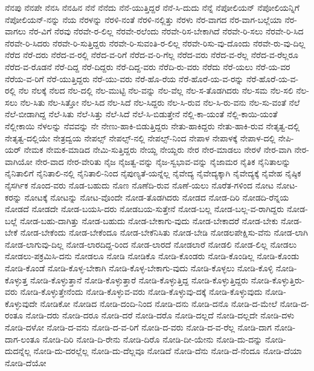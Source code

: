 {ನೆನಪು
ನೆನಪೇ
ನೆನಸಿ
ನೆನಹಿನ
ನೆನೆ
ನೆನೆದು
ನೆನೆ-ಯುತ್ತಿದ್ದರೆ
ನೆನೆ-ಸಿ-ದುದು
ನೆನ್ನೆ
ನೆಪೋಲಿಯನ್
ನೆಪೋಲಿಯನ್ನಿಗೆ
ನೆಪೋಲಿಯನ್-ನನ್ನು
ನೆಯ
ನೆರಳನ್ನು
ನೆರಳಿ-ನಂತೆ
ನೆರಳಿ-ನಲ್ಲಿತ್ತು
ನೆರಳು
ನೆರ-ವಾಗದ
ನೆರ-ವಾಗ-ಬಲ್ಲೆಯಾ
ನೆರ-ವಾಗಲು
ನೆರ-ವಿಗೆ
ನೆರವು
ನೆರವೇ-ರ-ಲಿಲ್ಲ
ನೆರವೇ-ರಲೆಂದು
ನೆರವೇ-ರಿಸ-ಬೇಕಾಗಿದೆ
ನೆರವೇ-ರಿ-ಸಲು
ನೆರವೇ-ರಿ-ಸಿದ
ನೆರವೇ-ರಿ-ಸಿದರು
ನೆರವೇ-ರಿ-ಸುತ್ತಿದ್ದರು
ನೆರವೇ-ರಿ-ಸುವಂತಿ-ರ-ಲಿಲ್ಲ
ನೆರವೇ-ರಿಸು-ವು-ದೊಂದು
ನೆರವೇ-ರು-ವು-ದಿಲ್ಲ
ನೆರೆದ
ನೆರೆ-ದರು
ನೆರೆದ-ವ-ರಲ್ಲಿ
ನೆರೆದ-ವ-ರಿಗೆ
ನೆರೆದ-ವ-ರಿ-ಗೆಲ್ಲ
ನೆರೆದ-ವರು
ನೆರೆದ-ವ-ರೆಲ್ಲ
ನೆರೆದ-ವ-ರೆಲ್ಲರೂ
ನೆರೆದ-ವ-ರೊಡನೆ
ನೆರೆ-ದಿದ್ದ
ನೆರೆ-ದಿದ್ದರು
ನೆರೆ-ದಿದ್ದ-ವರು
ನೆರೆದಿ-ರು-ವರು
ನೆರೆದು
ನೆರೆ-ಯಲು
ನೆರೆ-ಯ-ವರ
ನೆರೆಯ-ವ-ರಿಗೆ
ನೆರೆ-ಯುತ್ತಿದ್ದರು
ನೆರೆ-ಯು-ವರು
ನೆರೆ-ಹೊ-ರೆಯ
ನೆರೆ-ಹೊರೆ-ಯ-ವ-ರನ್ನು
ನೆರೆ-ಹೊರೆ-ಯ-ವ-ರಲ್ಲಿ
ನೆಲ
ನೆಲಕ್ಕೆ
ನೆಲದ
ನೆಲ-ದಲ್ಲಿ
ನೆಲ-ಮುಟ್ಟಿ
ನೆಲ-ವನ್ನು
ನೆಲ-ವೆಲ್ಲ
ನೆಲ-ಸ-ತೊಡಗಿದರು
ನೆಲ-ಸಮ
ನೆಲ-ಸಲಿ
ನೆಲ-ಸಲು
ನೆಲ-ಸಿತು
ನೆಲ-ಸಿತ್ತೋ
ನೆಲ-ಸಿದ
ನೆಲ-ಸಿದೆ
ನೆಲ-ಸಿದ್ದರು
ನೆಲ-ಸಿ-ರುವ
ನೆಲ-ಸಿ-ರು-ವನು
ನೆಲ-ಸು-ವಂತೆ
ನೆಲೆ
ನೆಲೆ-ಬೀಡಾಗಿದ್ದ
ನೆಲೆ-ಸಿತು
ನೆಲೆ-ಸಿತ್ತು
ನೆಲೆ-ಸಿದೆ
ನೆಲೆ-ಸಿ-ಬಿಡುತ್ತೇನೆ
ನೆಲ್ಲಿ-ಕಾ-ಯಂತೆ
ನೆಲ್ಲಿ-ಕಾಯಿ-ಯಂತೆ
ನೆಲ್ಲೀಕಾಯಿ
ನೆಳಲನ್ನು
ನೆವವನ್ನು
ನೇ
ನೇಣು-ಹಾಕಿ-ಬಿಡುತ್ತಿದ್ದರು
ನೇತು-ಹಾಕಿದ್ದರು
ನೇತು-ಹಾಕಿ-ರುವ
ನೇತೃತ್ವ-ದಲ್ಲಿ
ನೇತೃತ್ವ-ದಲ್ಲಿಯೇ
ನೇತ್ರದ್ವಯ
ನೇಪಲ್ಸ್
ನೇಪಲ್ಸ್-ನಲ್ಲಿ
ನೇಪಲ್ಸ್-ನಿಂದ
ನೇಪಾಳ
ನೇಪಾಳಕ್ಕೆ
ನೇಪಾಳ-ದಲ್ಲಿ
ನೇಪಿ-ಯರ್
ನೇಮಕ
ನೇಮಕ-ಮಾಡಿದ
ನೇಮಿ-ಸುತ್ತಿದ್ದರು
ನೇಯ್ದ
ನೇಯ್ದರು
ನೇರ
ನೇರ-ಮಾಡಲು
ನೇರಳೆ
ನೇರ-ವಾಗಿ
ನೇರ-ವಾಗಿಯೋ
ನೇರ-ವಾದ
ನೇರ-ವೇರಿತು
ನೈಜ
ನೈಜತ್ವ-ವನ್ನು
ನೈಜ-ಸ್ವಭಾವ-ವನ್ನು
ನೈಜಾಮರ
ನೈತಿಕ
ನೈನಿತಾಲನ್ನು
ನೈನಿತಾಲಿಗೆ
ನೈನಿತಾಲಿ-ನಲ್ಲಿ
ನೈನಿತಾಲಿ-ನಿಂದ
ನೈಪುಣ್ಯತೆ-ಯನ್ನೆಲ್ಲ
ನೈವೇದ್ಯ
ನೈವೇದ್ಯಕ್ಕಾಗಿ
ನೈವೇದ್ಯಕ್ಕೆ
ನೈವೇಹ
ನೈಷ್ಠಿಕ
ನೈಸರ್ಗಿಕ
ನೊಂದ-ವರು
ನೊಡ-ಬಹುದು
ನೊಣ
ನೊಣೆದಿ-ರುವ
ನೊಣೆ-ಯಲು
ನೊರೆತ-ಗಳಿಂದ
ನೋಟ
ನೋಟ-ಕರನ್ನು
ನೋಟಕ್ಕೆ
ನೋಟನ್ನು
ನೋಟ-ವೊಂದೇ
ನೋಡ-ತೊಡಗಿದರು
ನೋಡದ
ನೋಡ-ದಿರಿ
ನೋಡದಿ-ರೆನ್ನಯ
ನೋಡದೆ
ನೋಡದೇ
ನೋಡ-ಬಯಸಿ-ದರು
ನೋಡಬಯ-ಸುತ್ತೇನೆ
ನೋಡ-ಬಲ್ಲ
ನೋಡ-ಬಲ್ಲ-ವ-ರಾಗಿದ್ದರು
ನೋಡ-ಬಲ್ಲೆ
ನೋಡ-ಬಹು-ದಾಗಿತ್ತು
ನೋಡ-ಬಹುದು
ನೋಡ-ಬೇಕಾಗು-ವುದು
ನೋಡ-ಬೇಕಾದರೆ
ನೋಡ-ಬೇಕು
ನೋಡ-ಬೇಕೆ
ನೋಡ-ಬೇಕೆಂದು
ನೋಡ-ಬೇಕೆಂದೂ
ನೋಡ-ಬೇಕೆನಿಸಿತು
ನೋಡ-ಬೇಡಿ
ನೋಡಲಪೇಕ್ಷಿಸು-ವೆನು
ನೋಡ-ಲಾಗಿ
ನೋಡ-ಲಾಗುವು-ದಿಲ್ಲ
ನೋಡ-ಲಾರದಿದ್ದ-ರಿಂದ
ನೋಡ-ಲಾರದೆ
ನೋಡಲಾರೆ
ನೋಡಲಿ
ನೋಡ-ಲಿಲ್ಲ
ನೋಡಲು
ನೋಡಲು-ಪಕ್ರಮಿಸಿ-ದನು
ನೋಡಲೂ
ನೋಡಿ
ನೋಡಿಕೊ
ನೋಡಿ-ಕೊಂಡರು
ನೋಡಿ-ಕೊಂಡಿಲ್ಲ
ನೋಡಿ-ಕೊಂಡು
ನೋಡಿ-ಕೊಂಡೆ
ನೋಡಿ-ಕೊಳ್ಳ-ಬೇಕಾಗಿ
ನೋಡಿ-ಕೊಳ್ಳ-ಬೇಕಾಗು-ವುದು
ನೋಡಿ-ಕೊಳ್ಳಲು
ನೋಡಿ-ಕೊಳ್ಳಿ
ನೋಡಿ-ಕೊಳ್ಳುತ್ತ
ನೋಡಿ-ಕೊಳ್ಳುತ್ತಾನೆ
ನೋಡಿ-ಕೊಳ್ಳುತ್ತಾರೆ
ನೋಡಿ-ಕೊಳ್ಳುತ್ತಿದ್ದ
ನೋಡಿ-ಕೊಳ್ಳುತ್ತಿದ್ದರು
ನೋಡಿ-ಕೊಳ್ಳುತ್ತಿರು-ವರು
ನೋಡಿ-ಕೊಳ್ಳುತ್ತೇನೆಂದು
ನೋಡಿ-ಕೊಳ್ಳುವ-ವರು
ನೋಡಿ-ಕೊಳ್ಳುವು-ದಕ್ಕೆ
ನೋಡಿ-ಕೊಳ್ಳುವುದು
ನೋಡಿ-ಕೊಳ್ಳುವುದೇ
ನೋಡಿಕೋ
ನೋಡಿದ
ನೋಡಿ-ದಂದಿ-ನಿಂದ
ನೋಡಿ-ದನು
ನೋಡಿ-ದನೊ
ನೋಡಿ-ದ-ಮೇಲೆ
ನೋಡಿ-ದ-ರಂತೂ
ನೋಡಿ-ದರು
ನೋಡಿ-ದರೂ
ನೋಡಿ-ದರೆ
ನೋಡಿ-ದರೊ
ನೋಡಿ-ದಲ್ಲದೆ
ನೋಡಿ-ದಲ್ಲದೇ
ನೋಡಿ-ದಳು
ನೋಡಿ-ದಳೋ
ನೋಡಿ-ದ-ವನು
ನೋಡಿ-ದ-ವ-ರಿಗೆ
ನೋಡಿ-ದ-ವರು
ನೋಡಿ-ದ-ವ-ರೆಲ್ಲ
ನೋಡಿ-ದಾಗ
ನೋಡಿ-ದಾಗ-ಲಂತೂ
ನೋಡಿ-ದಿರಿ
ನೋಡಿ-ದಿ-ರೇನು
ನೋಡಿ-ದಿರೊ
ನೋಡಿ-ದೀ-ಯೇನು
ನೋಡಿ-ದು-ದನ್ನು
ನೋಡಿ-ದುದನ್ನೆಲ್ಲ
ನೋಡಿ-ದು-ದರಲ್ಲೆಲ್ಲ
ನೋಡಿ-ದು-ದೆಲ್ಲವೂ
ನೋಡಿದೆ
ನೋಡಿ-ದೆನು
ನೋಡಿ-ದೆ-ನೆಂದೂ
ನೋಡಿ-ದೆಯಾ
ನೋಡಿ-ದೆಯೋ
}
